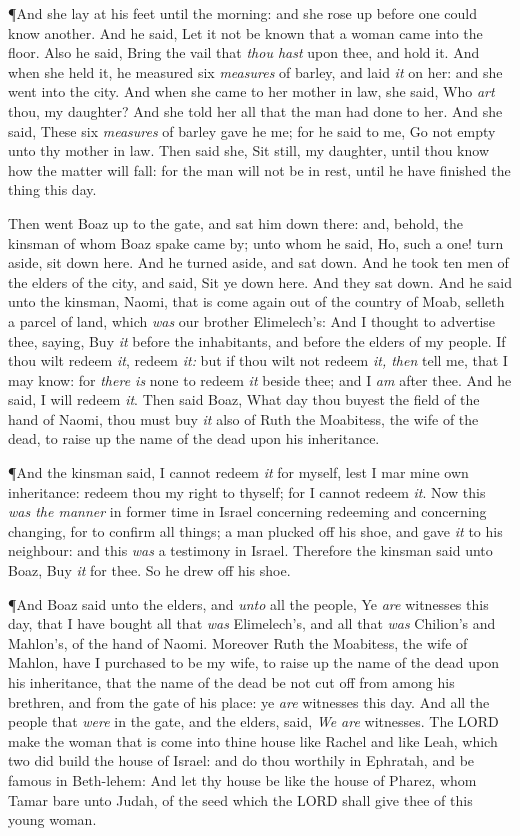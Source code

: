\documentclass[11pt,letterpaper,oneside]{memoir}
\begin{document}
\P And she lay at his feet until the morning: and she rose up before
one could know another. And he said, Let it not be known that a woman
came into the floor.  Also he said, Bring the vail that \emph{thou
hast} upon thee, and hold it. And when she held it, he measured six
\emph{measures} of barley, and laid \emph{it} on her: and she went
into the city.  And when she came to her mother in law, she said, Who
\emph{art} thou, my daughter? And she told her all that the man had
done to her.  And she said, These six \emph{measures} of barley gave
he me; for he said to me, Go not empty unto thy mother in law.  Then
said she, Sit still, my daughter, until thou know how the matter will
fall: for the man will not be in rest, until he have finished the
thing this day.

Then went Boaz up to the gate, and sat him down there: and, behold,
the kinsman of whom Boaz spake  came by; unto whom he said, Ho, such a
one! turn aside, sit down here. And he turned aside, and sat down.
And he took ten men of the elders of the city, and said, Sit ye down
here. And they sat down.  And he said unto the kinsman, Naomi, that is
come again out of the country of Moab, selleth a parcel of land, which
\emph{was} our brother Elimelech's:  And I thought to advertise thee,
saying, Buy \emph{it} before the inhabitants, and before the elders of
my people. If thou wilt redeem \emph{it}, redeem \emph{it:} but if
thou wilt not redeem \emph{it, then} tell me, that I may know: for
\emph{there is} none to redeem \emph{it} beside thee; and I \emph{am}
after thee. And he said, I will redeem \emph{it}.  Then said Boaz,
What day thou buyest the field of the hand of Naomi, thou must buy
\emph{it} also of Ruth the Moabitess, the wife of the dead, to raise
up the name of the dead upon his inheritance.

\P And the kinsman said, I cannot redeem \emph{it} for myself, lest I
mar mine own inheritance: redeem thou my right to thyself; for I
cannot redeem \emph{it}.  Now this \emph{was the manner} in former
time in Israel concerning redeeming and concerning changing, for to
confirm all things; a man plucked off his shoe, and gave \emph{it} to
his neighbour: and this \emph{was} a testimony in Israel.  Therefore
the kinsman said unto Boaz, Buy \emph{it} for thee. So he drew off his
shoe.

\P And Boaz said unto the elders, and \emph{unto} all the people, Ye
\emph{are} witnesses this day, that I have bought all that \emph{was}
Elimelech's, and all that \emph{was} Chilion's and Mahlon's, of the
hand of Naomi.  Moreover Ruth the Moabitess, the wife of Mahlon, have
I purchased to be my wife, to raise up the name of the dead upon his
inheritance, that the name of the dead be not cut off from among his
brethren, and from the gate of his place: ye \emph{are} witnesses this
day.  And all the people that \emph{were} in the gate, and the elders,
said, \emph{We are} witnesses. The \textsc{LORD} make the woman that
is come into thine house like Rachel and like Leah, which two did
build the house of Israel: and do thou worthily in Ephratah, and be
famous in Beth-lehem:  And let thy house be like the house of Pharez,
whom Tamar bare unto Judah, of the seed which the \textsc{LORD} shall
give thee of this young woman.
\end{document}
